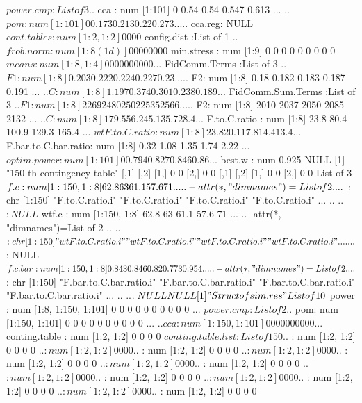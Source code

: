 \documentclass[11pt]{article} %
\begin{document}
\begin{Schunk}
\begin{Soutput}
 $ power.cmp           :List of 3
  ..$ cca    : num [1:101] 0 0.54 0.54 0.547 0.613 ...
  ..$ pom    : num [1:101] 0 0.173 0.213 0.22 0.273 ...
  ..$ cca.reg: NULL
 $ cont.tables         : num [1:2, 1:2] 0 0 0 0
 $ config.dist         :List of 1
  ..$ frob.norm: num [1:8(1d)] 0 0 0 0 0 0 0 0
 $ min.stress          : num [1:9] 0 0 0 0 0 0 0 0 0
 $ means               : num [1:8, 1:4] 0 0 0 0 0 0 0 0 0 0 ...
 $ FidComm.Terms       :List of 3
  ..$ F1: num [1:8] 0.203 0.222 0.224 0.227 0.23 ...
  ..$ F2: num [1:8] 0.18 0.182 0.183 0.187 0.191 ...
  ..$ C : num [1:8] 1.197 0.374 0.301 0.238 0.189 ...
 $ FidComm.Sum.Terms   :List of 3
  ..$ F1: num [1:8] 2269 2480 2502 2535 2566 ...
  ..$ F2: num [1:8] 2010 2037 2050 2085 2132 ...
  ..$ C : num [1:8] 179.5 56.2 45.1 35.7 28.4 ...
 $ F.to.C.ratio        : num [1:8] 23.8 80.4 100.9 129.3 165.4 ...
 $ wtF.to.C.ratio      : num [1:8] 23.8 20.1 17.8 14.4 13.4 ...
 $ F.bar.to.C.bar.ratio: num [1:8] 0.32 1.08 1.35 1.74 2.22 ...
 $ optim.power         : num [1:101] 0 0.794 0.827 0.846 0.86 ...
 $ best.w              : num 0.925
NULL
[1] "150 th contingency table"
     [,1] [,2]
[1,]    0    0
[2,]    0    0
     [,1] [,2]
[1,]    0    0
[2,]    0    0
List of 3
 $ f.c    : num [1:150, 1:8] 62.8 63 61.1 57.6 71 ...
  ..- attr(*, "dimnames")=List of 2
  .. ..$ : chr [1:150] "F.to.C.ratio.i" "F.to.C.ratio.i" "F.to.C.ratio.i" "F.to.C.ratio.i" ...
  .. ..$ : NULL
 $ wtf.c  : num [1:150, 1:8] 62.8 63 61.1 57.6 71 ...
  ..- attr(*, "dimnames")=List of 2
  .. ..$ : chr [1:150] "wtF.to.C.ratio.i" "wtF.to.C.ratio.i" "wtF.to.C.ratio.i" "wtF.to.C.ratio.i" ...
  .. ..$ : NULL
 $ f.c.bar: num [1:150, 1:8] 0.843 0.846 0.82 0.773 0.954 ...
  ..- attr(*, "dimnames")=List of 2
  .. ..$ : chr [1:150] "F.bar.to.C.bar.ratio.i" "F.bar.to.C.bar.ratio.i" "F.bar.to.C.bar.ratio.i" "F.bar.to.C.bar.ratio.i" ...
  .. ..$ : NULL
NULL
[1] "Struct of sim.res"
List of 10
 $ power             : num [1:8, 1:150, 1:101] 0 0 0 0 0 0 0 0 0 0 ...
 $ power.cmp         :List of 2
  ..$ pom: num [1:150, 1:101] 0 0 0 0 0 0 0 0 0 0 ...
  ..$ cca: num [1:150, 1:101] 0 0 0 0 0 0 0 0 0 0 ...
 $ conting.table     : num [1:2, 1:2] 0 0 0 0
 $ conting.table.list:List of 150
  ..$ : num [1:2, 1:2] 0 0 0 0
  ..$ : num [1:2, 1:2] 0 0 0 0
  ..$ : num [1:2, 1:2] 0 0 0 0
  ..$ : num [1:2, 1:2] 0 0 0 0
  ..$ : num [1:2, 1:2] 0 0 0 0
  ..$ : num [1:2, 1:2] 0 0 0 0
  ..$ : num [1:2, 1:2] 0 0 0 0
  ..$ : num [1:2, 1:2] 0 0 0 0
  ..$ : num [1:2, 1:2] 0 0 0 0
  ..$ : num [1:2, 1:2] 0 0 0 0
  ..$ : num [1:2, 1:2] 0 0 0 0
  ..$ : num [1:2, 1:2] 0 0 0 0
  ..$ : num [1:2, 1:2] 0 0 0 0

\end{Soutput}
\end{Schunk}
\end{document}

